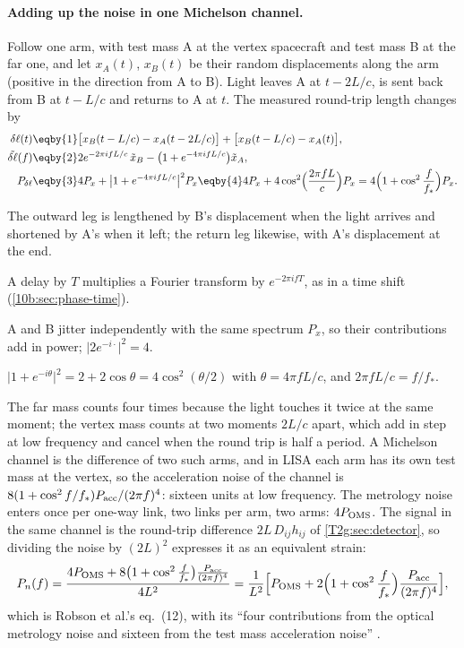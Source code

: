 \paragraph{Adding up the noise in one Michelson channel.}
Follow one arm, with test mass A at the vertex spacecraft and test mass B at the far one, and let $x_A(t)$, $x_B(t)$ be their random displacements along the arm (positive in the direction from A to B). Light leaves A at $t-2L/c$, is sent back from B at $t-L/c$ and returns to A at $t$. The measured round-trip length changes by
\begin{align}
  \delta\ell(t)
  &\eqby{1}\big[x_B(t-L/c)-x_A(t-2L/c)\big]+\big[x_B(t-L/c)-x_A(t)\big],\nonumber\\
  \tilde{\delta\ell}(f)
  &\eqby{2}2e^{-2\pi ifL/c}\,\tilde x_B-\big(1+e^{-4\pi ifL/c}\big)\tilde x_A,\nonumber\\
  P_{\delta\ell}
  &\eqby{3}4P_x+\big\lvert1+e^{-4\pi ifL/c}\big\rvert^2P_x
  \eqby{4}4P_x+4\cos^2\!\Big(\frac{2\pi fL}{c}\Big)P_x
  =4\Big(1+\cos^2\frac{f}{f_*}\Big)P_x .
\end{align}
\begin{explain}
  \item The outward leg is lengthened by B's displacement when the light arrives and shortened by A's when it left; the return leg likewise, with A's displacement at the end.
  \item A delay by $T$ multiplies a Fourier transform by $e^{-2\pi ifT}$, as in a time shift (\cref{10b:sec:phase-time}).
  \item A and B jitter independently with the same spectrum $P_x$, so their contributions add in power; $\lvert2e^{-i\cdot}\rvert^2=4$.
  \item $\lvert1+e^{-i\theta}\rvert^2=2+2\cos\theta=4\cos^2(\theta/2)$ with $\theta=4\pi fL/c$, and $2\pi fL/c=f/f_*$.
\end{explain}
The far mass counts four times because the light touches it twice at the same moment; the vertex mass counts at two moments $2L/c$ apart, which add in step at low frequency and cancel when the round trip is half a period. A Michelson channel is the difference of two such arms, and in LISA each arm has its own test mass at the vertex, so the acceleration noise of the channel is $8(1+\cos^2f/f_*)P_{\rm acc}/(2\pi f)^4$: sixteen units at low frequency. The metrology noise enters once per one-way link, two links per arm, two arms: $4P_{\rm OMS}$. The signal in the same channel is the round-trip difference $2L\,D_{ij}h_{ij}$ of \cref{T2g:sec:detector}, so dividing the noise by $(2L)^2$ expresses it as an equivalent strain:
\begin{equation}
  P_n(f)=\frac{4P_{\rm OMS}+8\big(1+\cos^2\frac{f}{f_*}\big)\frac{P_{\rm acc}}{(2\pi f)^4}}{4L^2}
  =\frac{1}{L^2}\Big[P_{\rm OMS}+2\Big(1+\cos^2\frac{f}{f_*}\Big)\frac{P_{\rm acc}}{(2\pi f)^4}\Big],
  \label{T2g:eq:Pn}
\end{equation}
which is Robson et al.'s eq.~(12), with its ``four contributions from the optical metrology noise and sixteen from the test mass acceleration noise'' \cite{Robson2019}.

